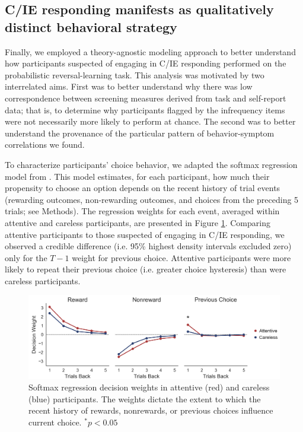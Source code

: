 \documentclass[a4paper,notitlepage,12pt]{article}
\begin{document}
\subsection{C/IE responding manifests as qualitatively distinct behavioral strategy}

Finally, we employed a theory-agnostic modeling approach to better understand how participants suspected of engaging in C/IE responding performed on the probabilistic reversal-learning task. This analysis was motivated by two interrelated aims. First was to better understand why there was low correspondence between screening measures derived from task and self-report data; that is, to determine why participants flagged by the infrequency items were not necessarily more likely to perform at chance. The second was to better understand  the provenance of the particular pattern of behavior-symptom correlations we found.

To characterize participants' choice behavior, we adapted the softmax regression model from \cite{seymour2012serotonin}. This model estimates, for each participant, how much their propensity to choose an option depends on the recent history of trial events (rewarding outcomes, non-rewarding outcomes, and choices from the preceding 5 trials; see Methods). The regression weights for each event, averaged within attentive and careless participants, are presented in Figure \ref{fig:regression}. Comparing attentive participants to those suspected of engaging in C/IE responding, we observed a credible difference (i.e. 95\% highest density intervals excluded zero) only for the $T-1$ weight for previous choice. Attentive participants were more likely to repeat their previous choice (i.e. greater choice hysteresis) than were careless participants.

\begin{figure}[!b]
\includegraphics[width=16cm]{../figures/main_03c.png}
\centering
\captionsetup{width=0.88\textwidth}
\caption{Softmax regression decision weights in attentive (red) and careless (blue) participants. The weights dictate the extent to which the recent history of rewards, nonrewards, or previous choices influence current choice. $^* p<0.05$}
\label{fig:regression}
\end{figure}
\end{document}
